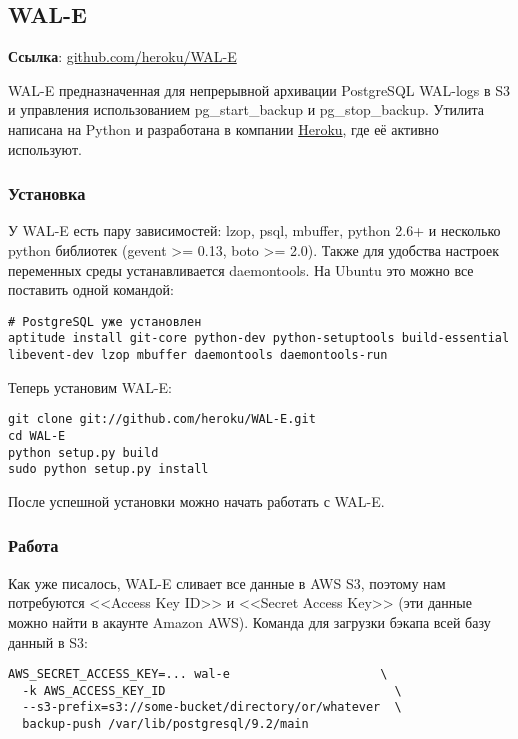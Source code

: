 \subsection{WAL-E}
\textbf{Ссылка}: \href{https://github.com/heroku/WAL-E}{github.com/heroku/WAL-E}

WAL-E предназначенная для непрерывной архивации PostgreSQL WAL-logs в S3 и управления использованием pg\_start\_backup и pg\_stop\_backup. Утилита написана на Python и разработана в компании \href{http://www.heroku.com/}{Heroku}, где её активно используют. 

\subsubsection{Установка}

У WAL-E есть пару зависимостей: lzop, psql, mbuffer, python 2.6+ и несколько python библиотек (gevent >= 0.13, boto >= 2.0). Также для удобства настроек переменных среды устанавливается daemontools. На Ubuntu это можно все поставить одной командой:

\begin{lstlisting}[label=lst:wal-e1,caption=Установка зависимостей для WAL-E]
# PostgreSQL уже установлен
aptitude install git-core python-dev python-setuptools build-essential libevent-dev lzop mbuffer daemontools daemontools-run
\end{lstlisting}

Теперь установим WAL-E:

\begin{lstlisting}[label=lst:wal-e2,caption=Установка WAL-E]
git clone git://github.com/heroku/WAL-E.git
cd WAL-E
python setup.py build
sudo python setup.py install
\end{lstlisting}

После успешной установки можно начать работать с WAL-E. 

\subsubsection{Работа}
Как уже писалось, WAL-E сливает все данные в AWS S3, поэтому нам потребуются <<Access Key ID>> и <<Secret Access Key>> (эти данные можно найти в акаунте Amazon AWS). Команда для загрузки бэкапа всей базу данный в S3:

\begin{lstlisting}[label=lst:wal-e3,caption=Загрузка бэкапа всей базы данных в S3]
AWS_SECRET_ACCESS_KEY=... wal-e                     \
  -k AWS_ACCESS_KEY_ID                                \
  --s3-prefix=s3://some-bucket/directory/or/whatever  \
  backup-push /var/lib/postgresql/9.2/main
\end{lstlisting}

